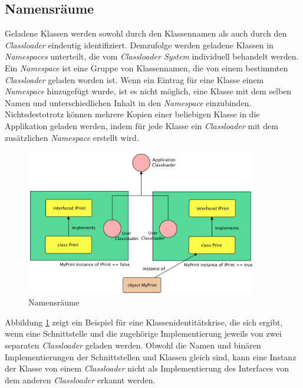   \subsection{Namensräume}
    Geladene Klassen werden sowohl durch den Klassennamen als auch durch den \textit{Classloader} eindeutig identifiziert. Demzufolge werden geladene Klassen in \textit{Namespaces} unterteilt, die vom \textit{Classloader System} individuell behandelt werden.
    \newline Ein \textit{Namespace} ist eine Gruppe von Klassennamen, die von einem bestimmten \textit{Classloader} geladen worden ist. Wenn ein Eintrag für eine Klasse einem \textit{Namespace} hinzugefügt wurde, ist es nicht möglich, eine Klasse mit dem selben Namen und unterschiedlichen Inhalt in den \textit{Namespace} einzubinden. 
    \newline Nichtsdestotrotz können mehrere Kopien einer beliebigen Klasse in die Applikation geladen werden, indem für jede Klasse ein \textit{Classloader} mit dem zusätzlichen \textit{Namespace} erstellt wird. 
    \begin{figure}[h]
      \centering
      \includegraphics[width=0.9\textwidth]{material/images/namespaces.png}
      \caption{Namensräume}
      \label{fig:namespaces}
    \end{figure}
    \newline Abbildung \ref{fig:namespaces} zeigt ein Beispiel für eine Klassenidentitätskrise, die sich ergibt, wenn eine Schnittstelle und die zugehörige Implementierung jeweils von zwei separaten \textit{Classloader} geladen werden. Obwohl die Namen und binären Implementierungen der Schnittstellen und Klassen gleich sind, kann eine Instanz der Klasse von einem \textit{Classloader} nicht als Implementierung des Interfaces von dem anderen \textit{Classloader} erkannt werden. \newline 
